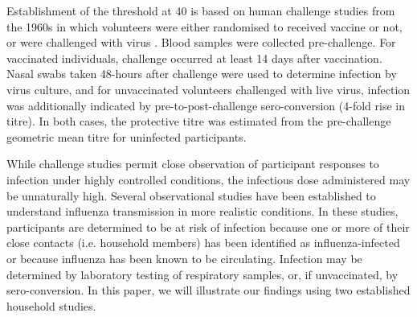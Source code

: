 Establishment of the threshold at 40 is based on human challenge studies from the 1960s in which volunteers were either randomised to received vaccine or not, or were challenged with virus \citep{Hobson;1972}. Blood samples were collected pre-challenge. For vaccinated individuals, challenge occurred at least 14 days after vaccination. Nasal swabs taken 48-hours after challenge were used to determine infection by virus culture, and for unvaccinated volunteers challenged with live virus, infection was additionally indicated by pre-to-post-challenge sero-conversion (4-fold rise in titre). In both cases, the protective titre was estimated from the pre-challenge geometric mean titre for uninfected participants. 

While challenge studies permit close observation of participant responses to infection under highly controlled conditions, the infectious dose administered may be unnaturally high. Several observational studies have been established to understand influenza transmission in more realistic conditions. In these studies, participants are determined to be at risk of infection because one or more of their close contacts (i.e. household members) has been identified as influenza-infected or because influenza has been known to be circulating.  Infection may be determined by laboratory testing of respiratory samples, or, if unvaccinated, by sero-conversion. In this paper, we will illustrate our findings using two established household studies. 
